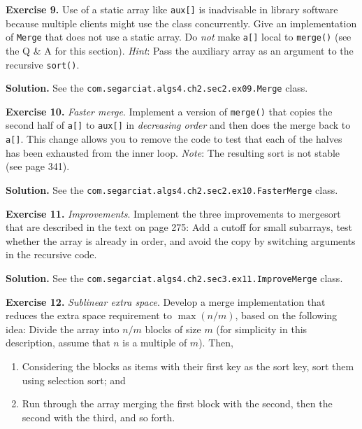 \documentclass[12pt, a4paper]{article}
\newenvironment{ex}[2][Exercise]
{\par\medskip\noindent \textbf{#1 #2.}}
{\medskip}
\newenvironment{sol}[1][Solution]
{\par\medskip\noindent \textbf{#1.} }
{\medskip}
\begin{document}
	\begin{ex}{9}
		Use of a static array like \texttt{aux[]} is inadvisable in library software because
		multiple clients might use the class concurrently. Give an implementation of \texttt{Merge}
		that does not use a static array. Do \emph{not} make \texttt{a[]} local to \texttt{merge()}
		(see the Q \& A for this section).
		\emph{Hint}: Pass the auxiliary array as an argument to the recursive \texttt{sort()}.
	\end{ex}
	\begin{sol}
		See the \texttt{com.segarciat.algs4.ch2.sec2.ex09.Merge} class.
	\end{sol}
	\begin{ex}{10}
		\emph{Faster merge}. Implement a version of \texttt{merge()} that copies the second half of
		\texttt{a[]} to \texttt{aux[]} in \emph{decreasing order} and then does the merge back to \texttt{a[]}.
		This change allows you to remove the code to test that each of the halves has been
		exhausted from the inner loop. \emph{Note}: The resulting sort is not stable
		(see page 341).
	\end{ex}
	\begin{sol}
		See the \texttt{com.segarciat.algs4.ch2.sec2.ex10.FasterMerge} class.
	\end{sol}
	\begin{ex}{11}
		\emph{Improvements}. Implement the three improvements to mergesort that are described
		in the text on page 275: Add a cutoff for small subarrays, test whether the array
		is already in order, and avoid the copy by switching arguments in the recursive code.
	\end{ex}
	\begin{sol}
		See the \texttt{com.segarciat.algs4.ch2.sec3.ex11.ImproveMerge} class.
	\end{sol}
	\begin{ex}{12}
		\emph{Sublinear extra space}. Develop a merge implementation that reduces the extra
		space requirement to $\max(n/m)$, based on the following idea: Divide the array into
		$n/m$ blocks of size $m$ (for simplicity in this description, assume that $n$ is a
		multiple of $m$). Then,
		\begin{enumerate}[label=(\roman*)]
			\item Considering the blocks as items with their first key as the sort key,
			sort them using selection sort; and
			\item Run through the array merging the first block with the second, then the
			second with the third, and so forth.
		\end{enumerate}
	\end{ex}
	\pagebreak
	\printbibliography
\end{document}
